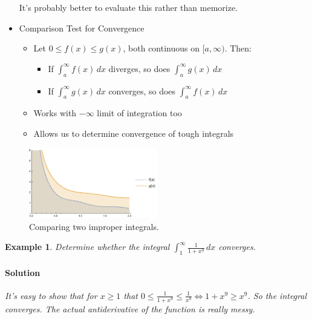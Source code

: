 \documentclass[letterpaper, 11pt, openany]{book}
\theoremstyle{mytheoremstyle}
\theoremstyle{myexamplestyle}
\newtheorem{example}{Example}[section]
\newenvironment{solution}{\paragraph{\sffamily \smaller \fontseries{b}\selectfont Solution}}{\hfill\faSquare}
\begin{document}
\begin{itemize}
\[    \]
    It's probably better to evaluate this rather than memorize.
    \item Comparison Test for Convergence
    \begin{itemize}
        \item Let $0 \leq f(x) \leq g(x)$, both continuous on $[a, \infty)$. Then:
        \begin{itemize}
            \item If $\displaystyle \int_{a}^{\infty} f(x)\, dx$ diverges, so does $\displaystyle \int_{a}^{\infty} g(x)\, dx$
            \item If $\displaystyle \int_{a}^{\infty} g(x)\, dx$ converges, so does $\displaystyle \int_{a}^{\infty} f(x)\, dx$
        \end{itemize}
        \item Works with $-\infty$ limit of integration too
        \item Allows us to determine convergence of tough integrals
    \end{itemize}
\end{itemize}
    
\begin{figure}[htbp]
    \centering
        \includegraphics[width=0.5\textwidth]{Figures/improperComp.pdf}
    \caption{Comparing two improper integrals.}
    \label{f:improperintComp}
\end{figure}

\begin{example}\label{e:impintcomp}
    Determine whether the integral $\displaystyle \int_{1}^{\infty} \frac{1}{1+x^{9}}\, dx$ converges.
    
    \begin{solution}
        It's easy to show that for $x \geq 1$ that $0 \leq \frac{1}{1+x^{9}} \leq \frac{1}{x^{9}} \Leftrightarrow 1 + x^{9} \geq x^{9}$. So the integral converges. The actual antiderivative of the function is really messy.
    \end{solution}
\end{example}
\end{document}
